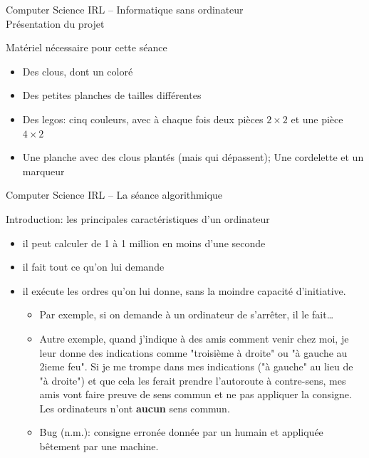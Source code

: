\documentclass[final,hyperref={pdfpagelabels=false}]{beamer}
\renewenvironment{Coupe}{   }{   }
\renewcommand*{\large}{\fontsize{\resultlargeX}{\resultlargeY}\selectfont}
\begin{document}
\begin{Coupe}
\begin{frame}{Computer Science IRL -- Informatique sans ordinateur\\[-5pt]
  {\large Présentation du projet}}
  \begin{block}{Matériel nécessaire pour cette séance}
    \begin{itemize}
    \item Des clous, dont un coloré
    \item Des petites planches de tailles différentes
    \item Des legos: cinq couleurs, avec à chaque fois deux pièces $2\times2$ et une
      pièce $4\times2$
    \item Une planche avec des clous plantés (mais qui dépassent); Une cordelette et un marqueur
    \end{itemize}
  \end{block}
\end{frame}
\begin{frame}{Computer Science IRL -- La séance algorithmique}
  \begin{block}{Introduction: les principales caractéristiques d'un ordinateur}
    \begin{itemize}\vspace{-.2\baselineskip}
    \item {} il peut calculer de 1 à 1
      million en moins d'une seconde
    \item {} il fait tout ce qu'on lui demande
    \item {} il exécute les
      ordres qu'on lui donne, sans la moindre capacité d'initiative.
      \begin{itemize}\vspace{-.8\baselineskip}
      \item Par exemple, si on demande à un ordinateur de s'arrêter, il le fait\ldots
      \item Autre exemple, quand j'indique à des amis comment venir chez moi,
        je leur donne des indications comme "troisième à droite" ou "à gauche
        au 2ieme feu". Si je me trompe dans mes indications ("à gauche" au lieu
        de "à droite") et que cela les ferait prendre l'autoroute à
        contre-sens, mes amis vont faire preuve de sens commun et ne pas
        appliquer la consigne. Les ordinateurs n'ont \textbf{aucun} sens commun.
      \item Bug (n.m.): consigne erronée donnée par un humain et appliquée bêtement par une machine.


\end{itemize}
\end{itemize}
\end{block}
\end{frame}
\end{Coupe}
\end{document}
